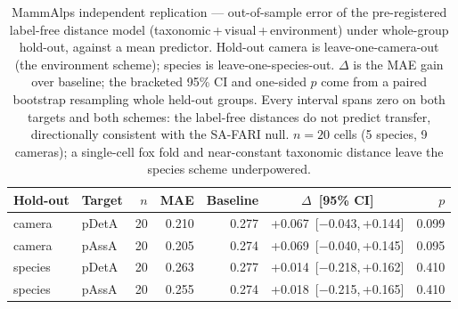 \begin{table}[htbp]\centering
  \caption{MammAlps independent replication --- out-of-sample error of the pre-registered label-free distance
  model (taxonomic\,+\,visual\,+\,environment) under whole-group hold-out, against a mean predictor. Hold-out
  camera is leave-one-camera-out (the environment scheme); species is leave-one-species-out.
  $\Delta$ is the MAE gain over baseline; the bracketed 95\% CI and one-sided $p$ come from a paired bootstrap
  resampling whole held-out groups. Every interval spans zero on both targets and both schemes: the label-free
  distances do not predict transfer, directionally consistent with the SA-FARI null. $n=20$ cells (5 species,
  9 cameras); a single-cell fox fold and near-constant taxonomic distance leave the species scheme
  underpowered.}
  \label{tab:replication_mammalps}
  \begin{tabular}{llrrrcr}
    \toprule
    Hold-out & Target & $n$ & MAE & Baseline & $\Delta$~[95\% CI] & $p$ \\
    \midrule
    camera  & pDetA & 20 & 0.210 & 0.277 & +0.067~[$-$0.043,\,+0.144] & 0.099 \\
    camera  & pAssA & 20 & 0.205 & 0.274 & +0.069~[$-$0.040,\,+0.145] & 0.095 \\
    species & pDetA & 20 & 0.263 & 0.277 & +0.014~[$-$0.218,\,+0.162] & 0.410 \\
    species & pAssA & 20 & 0.255 & 0.274 & +0.018~[$-$0.215,\,+0.165] & 0.410 \\
    \bottomrule
  \end{tabular}
\end{table}
